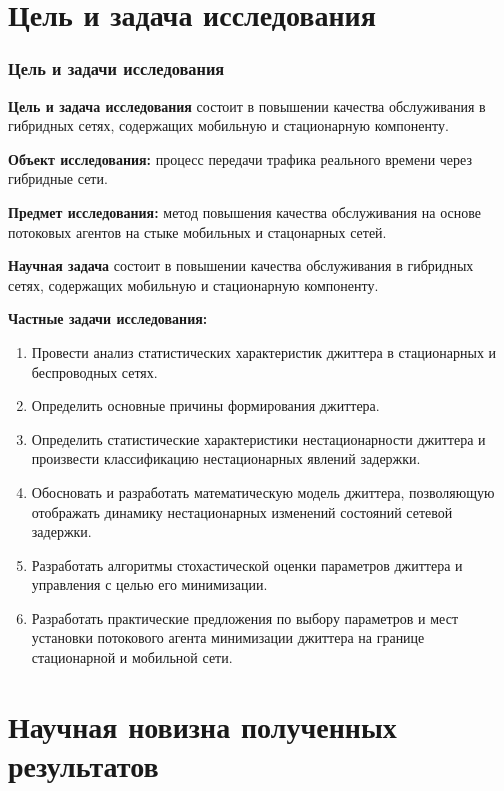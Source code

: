 \documentclass[10pt,pdf,hyperref={unicode}]{beamer}
\begin{document}
 

 
\section{Цель и задача исследования}

\begin{frame}
\frametitle{Цель и задачи исследования}
{\footnotesize
\textbf{Цель и задача исследования} состоит в повышении качества обслуживания в гибридных сетях, содержащих мобильную и стационарную компоненту.

\textbf{Объект исследования:} процесс передачи трафика реального времени через гибридные сети.

\textbf{Предмет исследования:} метод повышения качества обслуживания на основе потоковых агентов на стыке мобильных и стацонарных сетей.

\textbf{Научная задача} состоит в повышении качества обслуживания в гибридных сетях, содержащих мобильную и стационарную компоненту.

\textbf{Частные задачи исследования:}
}
{\scriptsize
\begin{enumerate}
  \item Провести анализ статистических характеристик джиттера в стационарных и беспроводных сетях.
  \item Определить основные причины формирования джиттера.
  \item Определить статистические характеристики нестационарности джиттера и произвести классификацию нестационарных явлений задержки.
  \item Обосновать и разработать математическую модель джиттера, позволяющую отображать динамику нестационарных изменений состояний сетевой задержки.
  \item Разработать алгоритмы стохастической оценки параметров джиттера и управления с целью его минимизации.
  \item Разработать практические предложения по выбору параметров и мест установки потокового агента минимизации джиттера на границе стационарной и мобильной сети.
\end{enumerate}
}

\end{frame}
 
\section{Научная новизна полученных результатов}
\end{document}
